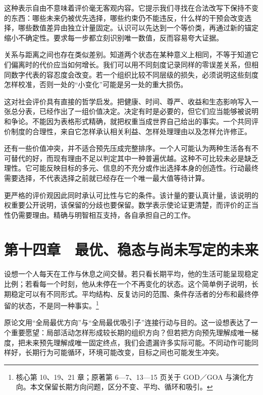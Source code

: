 \documentclass[
  11pt,
  oneside]{book}
\begin{document}
这种表示自由不意味着评价毫无客观内容。它提示我们寻找在合法改写下保持不变的东西：哪些未来仍被优先选择，哪些约束仍不能违反，什么样的干预会改变选择，哪些数值差异由独立计量固定。认识可以先达到一个等价类，再通过新的锚定缩小不确定性。要求每一步都立刻识别唯一数值，反而容易夸大证据。

关系与距离之间也存在类似差别。知道两个状态在某种意义上相同，不等于知道它们偏离时的代价应当如何增长。我们可以用不同刻度记录同样的零误差关系，但相同数字代表的容忍度会改变。若一个组织比较不同层级的损失，必须说明这些刻度怎样校准，否则一处的``小变化''可能是另一处的重大损伤。

这对社会评价具有直接的哲学启发。把健康、时间、尊严、收益和生态影响写入一张总分表，已经作出了一组价值决定。决定有时是必要的，但它们应当能够被说明和争论。不能因为表格形式精确，就把权重当成世界自己给出的事实。一个共同评价制度的合理性，来自它怎样承认相关利益、怎样处理理由以及怎样允许修正。

还有一些价值冲突，并不适合预先压成完整排序。一个人可能认为两种生活各有不可替代的好，而现有理由不足以判定其中一种普遍优越。这种不可比较未必是缺乏理性。它可能反映目标的多元、信息的不充分或作出选择本身的创造性。行动最终需要选择，不代表选择之前就已经存在一个唯一最大值等待计算。

\begingroup{}

更严格的评价观因此同时承认可比性与它的条件。该计量的要认真计量，该说明的权重要公开说明，该保留的分歧也要保留。数学表示使论证更清楚，而评价的正当性仍需要理由。精确与明智相互支持，各自承担自己的工作。

\par\endgroup

\chapter{第十四章　最优、稳态与尚未写定的未来}\label{ph-ch-14}

设想一个人每天在工作与休息之间交替。若只看长期平均，他的生活可能呈现稳定比例；若看每一个时刻，他从未停在一个不再变化的状态。这个简单例子说明，长期稳定可以有不同形式。平均结构、反复访问的范围、条件存活者的分布和最终停留的状态，不是同一种事实。\footnote{\hypertarget{ph-note-37}{}核心第 10、19、21 章；原著第 6---7、13---15 页关于 GOD／GOA 与演化方向。本文保留长期方向问题，区分不变、平均、循环和吸引。}

原论文用``全局最优方向''与``全局最优吸引子''连接行动与目的。这一设想表达了一个重要愿望：局部活动怎样形成较长期的组织方向？但若把方向预先理解成唯一梯度，把未来预先理解成唯一固定终点，我们会遗漏许多实际可能。不同动作可能同样好，长期行为可能循环，环境可能改变，目标之间也可能发生冲突。
\end{document}
